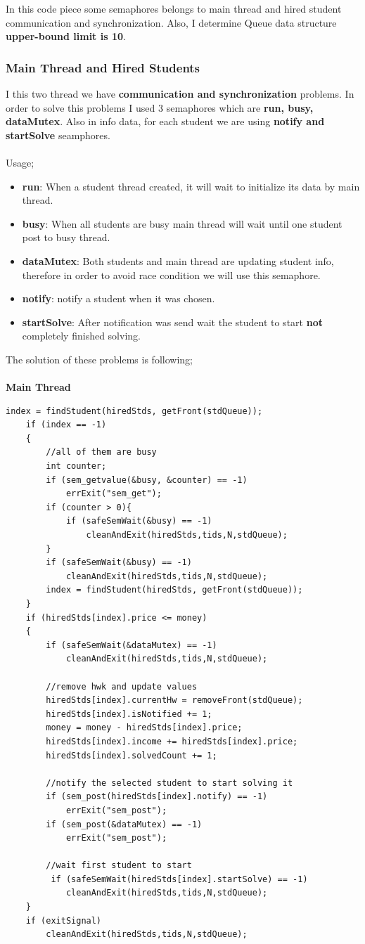 \documentclass{article}
\begin{document}
In this code piece some semaphores belongs to main thread and hired student communication and synchronization.
Also, I determine Queue data structure \textbf{upper-bound limit is 10}.
\subsubsection*{Main Thread and Hired Students}
I this two thread we have \textbf{communication and synchronization} problems. In order to solve this problems I used 3 semaphores 
which are \textbf{run, busy, dataMutex}. Also in info data, for each student we are using \textbf{notify and startSolve} seamphores. \\ \\
Usage;
\begin{itemize}
	\item \textbf{run}: When a student thread created, it will wait to initialize its data by main thread.
	\item \textbf{busy}: When all students are busy main thread will wait until one student post to busy thread.
	\item \textbf{dataMutex}: Both students and main thread are updating student info, therefore in order to avoid race
	condition we will use this semaphore.
	\item \textbf{notify}: notify a student when it was chosen.
	\item \textbf{startSolve}: After notification was send wait the student to start \textbf{not} completely finished solving.
\end{itemize}
The solution of these problems is following;\\ \\
\textbf{Main Thread}
\begin{lstlisting}[style=CStyle]
	index = findStudent(hiredStds, getFront(stdQueue));
	if (index == -1)
	{
		//all of them are busy
		int counter;
		if (sem_getvalue(&busy, &counter) == -1)
			errExit("sem_get");
		if (counter > 0){
			if (safeSemWait(&busy) == -1)
            	cleanAndExit(hiredStds,tids,N,stdQueue);
		}
		if (safeSemWait(&busy) == -1)
        	cleanAndExit(hiredStds,tids,N,stdQueue);
		index = findStudent(hiredStds, getFront(stdQueue));
	}
	if (hiredStds[index].price <= money)
	{
		if (safeSemWait(&dataMutex) == -1)
        	cleanAndExit(hiredStds,tids,N,stdQueue);
			
		//remove hwk and update values  
		hiredStds[index].currentHw = removeFront(stdQueue);
		hiredStds[index].isNotified += 1;
		money = money - hiredStds[index].price;
		hiredStds[index].income += hiredStds[index].price;
		hiredStds[index].solvedCount += 1;
		
		//notify the selected student to start solving it
		if (sem_post(hiredStds[index].notify) == -1)
			errExit("sem_post");
		if (sem_post(&dataMutex) == -1)
			errExit("sem_post");
			
		//wait first student to start
		 if (safeSemWait(hiredStds[index].startSolve) == -1)
         	cleanAndExit(hiredStds,tids,N,stdQueue);
	}
	if (exitSignal)
    	cleanAndExit(hiredStds,tids,N,stdQueue);
\end{lstlisting}
\end{document}
